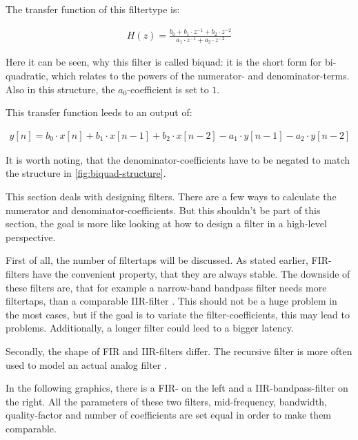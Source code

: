 The transfer function of this filtertype is:

\begin{align}
    H(z) = \frac{b_0 + b_1 \cdot z^{-1} + b_2 \cdot z^{-2}}{a_1 \cdot z^{-1} + a_2 \cdot z^{-2}}
\end{align}

Here it can be seen, why this filter is called \frqq biquad\flqq{}: it is the short form for
\frqq bi-quadratic\flqq{}, which relates to the powers of the numerator- and denominator-terms.
Also in this structure, the $a_0$-coefficient is set to $1$.

This transfer function leeds to an output of:

\begin{align}
    y[n] = b_0 \cdot x[n] + b_1 \cdot x[n-1] + b_2 \cdot x[n-2] - a_1 \cdot y[n-1] - a_2 \cdot y[n-2]
\end{align}

It is worth noting, that the denominator-coefficients have to be negated to match the structure in
\autoref{fig:biquad-structure}.



This section deals with designing filters. There are a few ways to calculate the numerator and
denominator-coefficients. But this shouldn't be part of this section, the goal is more like looking at
how to design a filter in a high-level perspective.

First of all, the number of filtertaps will be discussed. As stated earlier, \ac{FIR}-filters have
the convenient property, that they are always stable. The downside of these filters are,
that for example a narrow-band bandpass filter needs more filtertaps, than a comparable
\ac{IIR}-filter \cite{meyer_signalverarbeitung}. This should not be a huge problem in the most cases,
but if the goal is to variate the filter-coefficients, this may lead to problems. Additionally, a longer filter
could leed to a bigger latency.

Secondly, the shape of \ac{FIR} and \ac{IIR}-filters differ. The recursive filter is more often used to
model an actual analog filter \cite{meyer_signalverarbeitung}.

In the following graphics, there is a \ac{FIR}- on the left and a \ac{IIR}-bandpass-filter on the right.
All the parameters of these two filters, mid-frequency, bandwidth, quality-factor and number of coefficients
are set equal in order to make them comparable.

